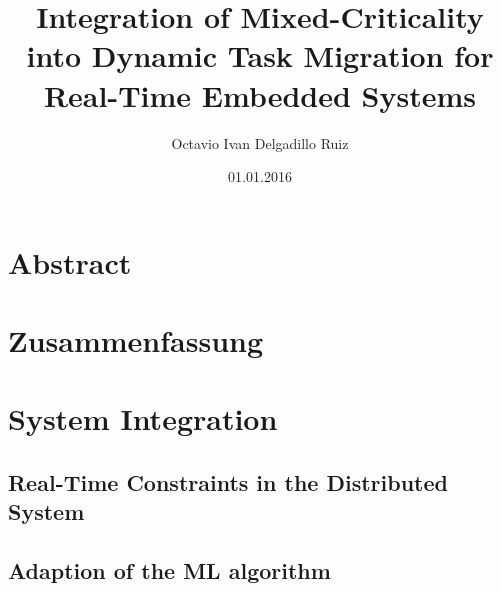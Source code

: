 \documentclass[%
]{tumDiss}
\title{%
  Integration of Mixed-Criticality into Dynamic Task Migration for Real-Time Embedded Systems
}
\author{Octavio Ivan Delgadillo Ruiz}
\date{01.01.2016}
\begin{document}
\frontmatter
\maketitle

\chapter{Abstract}

\lipsum[1-4]



\chapter{Zusammenfassung}

\lipsum[1-4]



\tableofcontents
\listoffigures
\listoftables
\printglossary[type=\acronymtype, nonumberlist]



\mainmatter





%








\chapter{System Integration}
\section{Real-Time Constraints in the Distributed System}
\section{Adaption of the ML algorithm}
\end{document}
